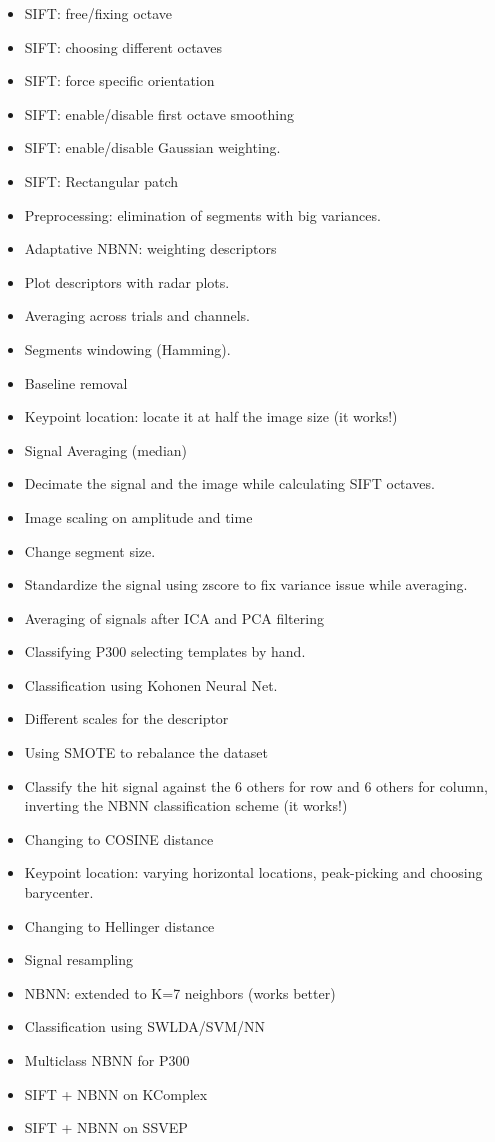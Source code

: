 \begin{itemize}
\item SIFT: free/fixing octave
\item SIFT: choosing different octaves
\item SIFT: force specific orientation
\item SIFT: enable/disable first octave smoothing
\item SIFT: enable/disable Gaussian weighting.
\item SIFT: Rectangular patch
\item Preprocessing: elimination of segments with big variances.
\item Adaptative NBNN: weighting descriptors
\item Plot descriptors with radar plots.
\item Averaging across trials and channels.
\item Segments windowing (Hamming).
\item Baseline removal
\item Keypoint location: locate it at half the image size (it works!)
\item Signal Averaging (median)
\item Decimate the signal and the image while calculating SIFT octaves.
\item Image scaling on amplitude and time
\item Change segment size.
\item Standardize the signal using zscore to fix variance issue while averaging.
\item Averaging of signals after ICA and PCA filtering
\item Classifying P300 selecting templates by hand.
\item Classification using Kohonen Neural Net.
\item Different scales for the descriptor
\item Using SMOTE to rebalance the dataset
\item Classify the hit signal against the 6 others for row and 6 others for column, inverting the NBNN classification scheme (it works!)
\item Changing to COSINE distance
\item Keypoint location: varying horizontal locations, peak-picking and choosing barycenter.
\item Changing to Hellinger distance
\item Signal resampling
\item NBNN: extended to K=7 neighbors (works better)
\item Classification using SWLDA/SVM/NN
\item Multiclass NBNN for P300
\item SIFT + NBNN on KComplex
\item SIFT + NBNN on SSVEP
\end{itemize}


